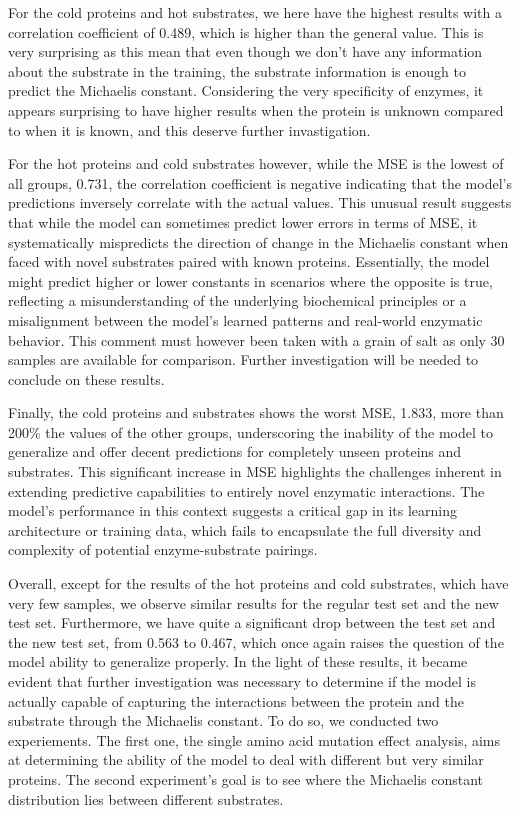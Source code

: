 For the cold proteins and hot substrates, we here have the highest results with a correlation coefficient of 0.489, which is higher than the general value. This is very surprising as this mean that even though we don't have any information about the substrate in the training, the substrate information is enough to predict the Michaelis constant. Considering the very specificity of enzymes, it appears surprising to have higher results when the protein is unknown compared to when it is known, and this deserve further invastigation.

For the hot proteins and cold substrates however, while the MSE is the lowest of all groups, 0.731, the correlation coefficient is negative indicating that the model's predictions inversely correlate with the actual values. This unusual result suggests that while the model can sometimes predict lower errors in terms of MSE, it systematically mispredicts the direction of change in the Michaelis constant when faced with novel substrates paired with known proteins. Essentially, the model might predict higher or lower constants in scenarios where the opposite is true, reflecting a misunderstanding of the underlying biochemical principles or a misalignment between the model's learned patterns and real-world enzymatic behavior. This comment must however been taken with a grain of salt as only 30 samples are available for comparison. Further investigation will be needed to conclude on these results. 

Finally, the cold proteins and substrates shows the worst MSE, 1.833, more than 200\% the values of the other groups, underscoring the inability of the model to generalize and offer decent predictions for completely unseen proteins and substrates. This significant increase in MSE highlights the challenges inherent in extending predictive capabilities to entirely novel enzymatic interactions. The model's performance in this context suggests a critical gap in its learning architecture or training data, which fails to encapsulate the full diversity and complexity of potential enzyme-substrate pairings.

Overall, except for the results of the hot proteins and cold substrates, which have very few samples, we observe similar results for the regular test set and the new test set. Furthermore, we have quite a significant drop between the test set and the new test set, from 0.563 to 0.467, which once again raises the question of the model ability to generalize properly. In the light of these results, it became evident that further investigation was necessary to determine if the model is actually capable of capturing the interactions between the protein and the substrate through the Michaelis constant. To do so, we conducted two experiements. The first one, the single amino acid mutation effect analysis, aims at determining the ability of the model to deal with different but very similar proteins. The second experiment's goal is to see where the Michaelis constant distribution lies between different substrates.

